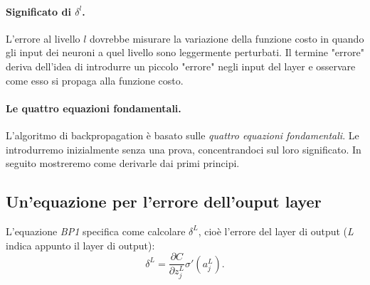 \paragraph{Significato di $\textbf{$\delta^l$}$.} L'errore al livello $l$ dovrebbe misurare la variazione della funzione costo in quando gli input dei neuroni a quel livello sono leggermente perturbati. Il termine "errore" deriva dell'idea di introdurre un piccolo "errore" negli input del layer e osservare come esso si propaga alla funzione costo.

\paragraph{Le quattro equazioni fondamentali.} L'algoritmo di backpropagation è basato sulle \textit{quattro equazioni fondamentali}. Le introdurremo inizialmente senza una prova, concentrandoci sul loro significato. In seguito mostreremo come derivarle dai primi principi.
\newline
\newline
\subsection{Un'equazione per l'errore dell'ouput layer}
L'equazione \textit{BP1} specifica come calcolare $\delta^L$, cioè l'errore del layer di output (\textit{L} indica appunto il layer di output):
\begin{equation}
    \delta^L=\frac{\partial C}{\partial z^L_j}\sigma'(a^L_j).
\end{equation}
